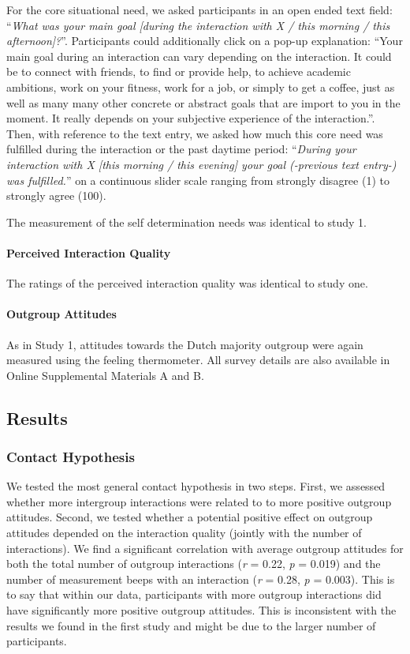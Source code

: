 For the core situational need, we asked participants in an open ended
text field:
``\textit{What was your main goal [during the interaction with X / this morning / this afternoon]?}''.
Participants could additionally click on a pop-up explanation: ``Your
main goal during an interaction can vary depending on the interaction.
It could be to connect with friends, to find or provide help, to achieve
academic ambitions, work on your fitness, work for a job, or simply to
get a coffee, just as well as many many other concrete or abstract goals
that are import to you in the moment. It really depends on your
subjective experience of the interaction.''. Then, with reference to the
text entry, we asked how much this core need was fulfilled during the
interaction or the past daytime period:
``\textit{During your interaction with X [this morning / this evening] your goal (-previous text entry-) was fulfilled.}''
on a continuous slider scale ranging from strongly disagree (1) to
strongly agree (100).

The measurement of the self determination needs was identical to study
1.

\paragraph{Perceived Interaction Quality}

The ratings of the perceived interaction quality was identical to study
one.

\paragraph{Outgroup Attitudes}

As in Study 1, attitudes towards the Dutch majority outgroup were again
measured using the feeling thermometer. All survey details are also
available in Online Supplemental Materials A and B.

\subsection{Results}

\subsubsection{Contact Hypothesis}

We tested the most general contact hypothesis in two steps. First, we
assessed whether more intergroup interactions were related to to more
positive outgroup attitudes. Second, we tested whether a potential
positive effect on outgroup attitudes depended on the interaction
quality (jointly with the number of interactions). We find a significant
correlation with average outgroup attitudes for both the total number of
outgroup interactions (\textit{r} = 0.22, \textit{p} = 0.019) and the
number of measurement beeps with an interaction (\textit{r} = 0.28,
\textit{p} = 0.003). This is to say that within our data, participants
with more outgroup interactions did have significantly more positive
outgroup attitudes. This is inconsistent with the results we found in
the first study and might be due to the larger number of participants.

